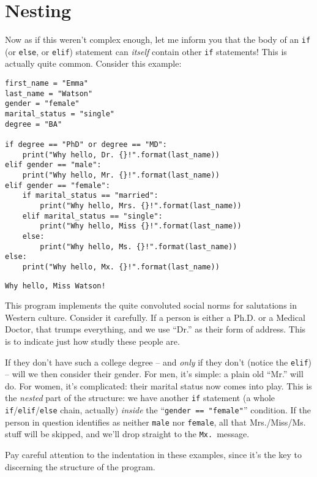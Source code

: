 \section{Nesting}


Now as if this weren't complex enough, let me inform you that the body of an
\texttt{if} (or \texttt{else}, or \texttt{elif}) statement can \textit{itself}
contain other \texttt{if} statements! This is actually quite common. Consider
this example:


\begin{Verbatim}[fontsize=\small,samepage=true,frame=single,framesep=3mm]
first_name = "Emma"
last_name = "Watson"
gender = "female"
marital_status = "single"
degree = "BA"

if degree == "PhD" or degree == "MD":
    print("Why hello, Dr. {}!".format(last_name))
elif gender == "male":
    print("Why hello, Mr. {}!".format(last_name))
elif gender == "female":
    if marital_status == "married":
        print("Why hello, Mrs. {}!".format(last_name))
    elif marital_status == "single":
        print("Why hello, Miss {}!".format(last_name))
    else:
        print("Why hello, Ms. {}!".format(last_name))
else:
    print("Why hello, Mx. {}!".format(last_name))
\end{Verbatim}
\vspace{-.2in}

\begin{Verbatim}[fontsize=\small,samepage=true,frame=leftline,framesep=5mm,framerule=1mm]
Why hello, Miss Watson!
\end{Verbatim}

This program implements the quite convoluted social norms for salutations in
Western culture. Consider it carefully. If a person is either a Ph.D. or a
Medical Doctor, that trumps everything, and we use ``Dr.'' as their form of
address. This is to indicate just how studly these people are.

If they don't have such a college degree -- and \textit{only} if they don't
(notice the \texttt{elif}) -- will we then consider their gender. For men, it's
simple: a plain old ``Mr.'' will do. For women, it's complicated: their marital
status now comes into play. This is the \textit{nested} part of the structure:
we have another \texttt{if} statement (a whole
\texttt{if}/\texttt{elif}/\texttt{else} chain, actually) \textit{inside} the
``\texttt{gender == "female"}'' condition. If the person in question identifies
as neither \texttt{male} nor \texttt{female}, all that Mrs./Miss/Ms. stuff will
be skipped, and we'll drop straight to the \texttt{Mx.}~message.


Pay careful attention to the indentation in these examples, since it's the key
to discerning the structure of the program.

